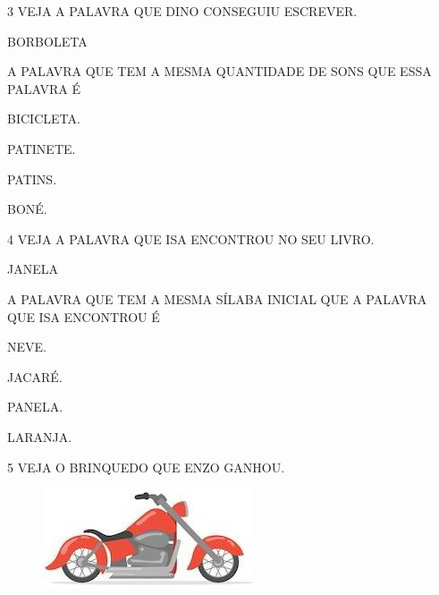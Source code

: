 \num{3} VEJA A PALAVRA QUE DINO CONSEGUIU ESCREVER.

\begin{myquote}
\centering\large{BORBOLETA}
\end{myquote}

A PALAVRA QUE TEM A MESMA QUANTIDADE DE SONS QUE ESSA PALAVRA É 

\begin{multicols}{2}
\begin{escolha}%
\item BICICLETA.

\item PATINETE.

\item PATINS.

\item BONÉ.
\end{escolha}
\end{multicols}

\num{4} VEJA A PALAVRA QUE ISA ENCONTROU NO SEU LIVRO. 

\begin{myquote}
\centering\large{JANELA}
\end{myquote}

A PALAVRA QUE TEM A MESMA SÍLABA INICIAL QUE A PALAVRA QUE ISA ENCONTROU É

\begin{multicols}{2}
\begin{escolha}%
\item NEVE.

\item JACARÉ.

\item PANELA.

\item LARANJA.
\end{escolha}
\end{multicols}

\num{5} VEJA O BRINQUEDO QUE ENZO GANHOU.

\begin{figure}[H]
\centering
\includegraphics[width=.4\textwidth]{media/image245.jpg}
\end{figure}

